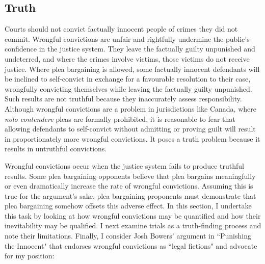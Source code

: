 \subsection{Truth}

Courts should not convict factually innocent people of crimes they did not commit. Wrongful convictions are unfair and rightfully undermine the public's confidence in the justice system. They leave the factually guilty unpunished and undeterred, and where the crimes involve victims, those victims do not receive justice. Where plea bargaining is allowed, some factually innocent defendants will be inclined to self-convict in exchange for a favourable resolution to their case, wrongfully convicting themselves while leaving the factually guilty unpunished. Such results are not truthful because they inaccurately assess responsibility. Although wrongful convictions are a problem in jurisdictions like Canada, where \textit{nolo contendere} pleas are formally prohibited, it is reasonable to fear that allowing defendants to self-convict without admitting or proving guilt will result in proportionately more wrongful convictions. It poses a truth problem because it results in untruthful convictions.

Wrongful convictions occur when the justice system fails to produce truthful results. Some plea bargaining opponents believe that plea bargains meaningfully or even dramatically increase the rate of wrongful convictions. Assuming this is true for the argument's sake, plea bargaining proponents must demonstrate that plea bargaining somehow offsets this adverse effect. In this section, I undertake this task by looking at how wrongful convictions may be quantified and how their inevitability may be qualified. I next examine trials as a truth-finding process and note their limitations. Finally, I consider Josh Bowers' argument in ``Punishing the Innocent" that endorses wrongful convictions as ``legal fictions" and advocate for my position:

